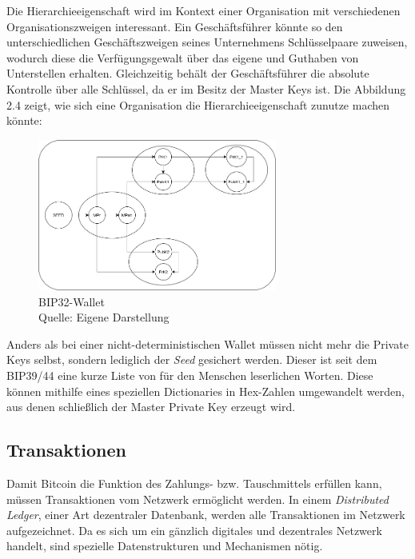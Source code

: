 Die Hierarchieeigenschaft wird im Kontext einer Organisation mit verschiedenen Organisationszweigen interessant. Ein Geschäftsführer könnte so den unterschiedlichen Geschäftszweigen seines Unternehmens Schlüsselpaare zuweisen, wodurch diese die Verfügungsgewalt über das eigene und Guthaben von Unterstellen erhalten. Gleichzeitig behält der Geschäftsführer die absolute Kontrolle über alle Schlüssel, da er im Besitz der Master Keys ist. Die Abbildung 2.4 zeigt, wie sich eine Organisation die Hierarchieeigenschaft zunutze machen könnte:
\begin{figure}[htpb]
	\centering
	\includegraphics[width=0.7\textwidth]{images/bip32_wallet.png}
	\caption{BIP32-Wallet\\
	Quelle: Eigene Darstellung}
	\label{6braun:fig:_wallet}
\end{figure}
Anders als bei einer nicht-deterministischen Wallet müssen nicht mehr die Private Keys selbst, sondern lediglich der \emph{Seed} gesichert werden. Dieser ist seit dem BIP39/44 eine kurze Liste von für den Menschen leserlichen Worten. Diese können mithilfe eines speziellen Dictionaries in Hex-Zahlen umgewandelt werden, aus denen schließlich der Master Private Key erzeugt wird.
\subsection{Transaktionen}
Damit Bitcoin die Funktion des Zahlungs- bzw. Tauschmittels erfüllen kann, müssen Transaktionen vom Netzwerk ermöglicht werden. In einem \emph{Distributed Ledger}, einer Art dezentraler Datenbank, werden alle Transaktionen im Netzwerk aufgezeichnet. Da es sich um ein gänzlich digitales und dezentrales Netzwerk handelt, sind spezielle Datenstrukturen und Mechanismen nötig.
